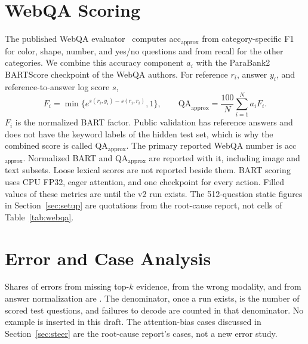 \section{WebQA Scoring}
\label{app:webqa_scoring}
The published WebQA evaluator~\cite{chang2022webqa} computes acc$_{\mathrm{approx}}$ from category-specific F1 for color, shape, number, and yes/no questions and from recall for the other categories.
We combine this accuracy component $a_i$ with the ParaBank2 BARTScore checkpoint of the WebQA authors.
For reference $r_i$, answer $y_i$, and reference-to-answer log score $s$,
\begin{equation}
F_i=\min\bigl\{e^{s(r_i,y_i)-s(r_i,r_i)},1\bigr\},\qquad
\mathrm{QA}_{\mathrm{approx}}=\frac{100}{N}\sum_{i=1}^{N}a_i F_i .
\label{eq:webqa}
\end{equation}
$F_i$ is the normalized BART factor.
Public validation has reference answers and does not have the keyword labels of the hidden test set, which is why the combined score is called QA$_{\mathrm{approx}}$.
The primary reported WebQA number is acc$_{\mathrm{approx}}$.
Normalized BART and QA$_{\mathrm{approx}}$ are reported with it, including image and text subsets.
Loose lexical scores are not reported beside them.
BART scoring uses CPU FP32, eager attention, and one checkpoint for every action.
Filled values of these metrics are \ph{} until the v2 run exists.
The 512-question static figures in Section~\ref{sec:setup} are quotations from the root-cause report, not cells of Table~\ref{tab:webqa}.

\section{Error and Case Analysis}
\label{app:error}
Shares of errors from missing top-$k$ evidence, from the wrong modality, and from answer normalization are \ph{}.
The denominator, once a run exists, is the number of scored test questions, and failures to decode are counted in that denominator.
No example is inserted in this draft.
The attention-bias cases discussed in Section~\ref{sec:steer} are the root-cause report's cases, not a new error study.

